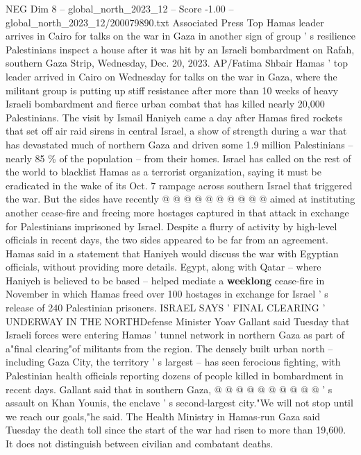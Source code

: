 \begin{textsample}{NEG Dim 8 – global\_north\_2023\_12 – Score -1.00 – global\_north\_2023\_12/200079890.txt}  \label{ex:f8_neg_174}
Associated Press Top Hamas leader arrives in Cairo for talks on the war in Gaza in another sign of group ' s resilience Palestinians inspect a house after it was hit by an Israeli bombardment on Rafah, southern Gaza Strip, Wednesday, Dec. 20, 2023.
AP/Fatima Shbair Hamas ' top leader arrived in Cairo on Wednesday for talks on the war in Gaza, where the militant group is putting up stiff resistance after more than 10 weeks of heavy Israeli bombardment and fierce urban combat that has killed nearly 20,000 Palestinians.
The visit by Ismail Haniyeh came a day after Hamas fired rockets that set off air raid sirens in central Israel, a show of strength during a war that has devastated much of northern Gaza and driven some 1.9 million Palestinians -- nearly 85 \% of the population -- from their homes.
Israel has called on the rest of the world to blacklist Hamas as a terrorist organization, saying it must be eradicated in the wake of its Oct. 7 rampage across southern Israel that triggered the war.
But the sides have recently @ @ @ @ @ @ @ @ @ @ aimed at instituting another cease-fire and freeing more hostages captured in that attack in exchange for Palestinians imprisoned by Israel.
Despite a flurry of activity by high-level officials in recent days, the two sides appeared to be far from an agreement.
Hamas said in a statement that Haniyeh would discuss the war with Egyptian officials, without providing more details.
Egypt, along with Qatar -- where Haniyeh is believed to be based -- helped mediate a \textbf{weeklong} cease-fire in November in which Hamas freed over 100 hostages in exchange for Israel ' s release of 240 Palestinian prisoners.
ISRAEL SAYS ' FINAL CLEARING ' UNDERWAY IN THE NORTHDefense Minister Yoav Gallant said Tuesday that Israeli forces were entering Hamas ' tunnel network in northern Gaza as part of a"final clearing"of militants from the region.
The densely built urban north -- including Gaza City, the territory ' s largest -- has seen ferocious fighting, with Palestinian health officials reporting dozens of people killed in bombardment in recent days.
Gallant said that in southern Gaza, @ @ @ @ @ @ @ @ @ @ ' s assault on Khan Younis, the enclave ' s second-largest city."We will not stop until we reach our goals,"he said.
The Health Ministry in Hamas-run Gaza said Tuesday the death toll since the start of the war had risen to more than 19,600.
It does not distinguish between civilian and combatant deaths.

\end{textsample}
